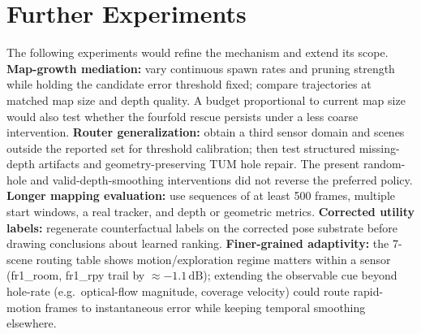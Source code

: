 \documentclass[10pt,twocolumn,letterpaper]{article}
\begin{document}
\section{Further Experiments}
The following experiments would refine the mechanism and extend its scope.
\textbf{Map-growth mediation:} vary continuous spawn rates and pruning strength while holding the candidate error threshold fixed; compare trajectories at matched map size and depth quality. A budget proportional to current map size would also test whether the fourfold rescue persists under a less coarse intervention.
\textbf{Router generalization:} obtain a third sensor domain and scenes outside the reported set for threshold calibration; then test structured missing-depth artifacts and geometry-preserving TUM hole repair. The present random-hole and valid-depth-smoothing interventions did not reverse the preferred policy.
\textbf{Longer mapping evaluation:} use sequences of at least 500 frames, multiple start windows, a real tracker, and depth or geometric metrics.
\textbf{Corrected utility labels:} regenerate counterfactual labels on the corrected pose substrate before drawing conclusions about learned ranking.
\textbf{Finer-grained adaptivity:} the 7-scene routing table shows motion/exploration regime matters within a sensor (fr1\_room, fr1\_rpy trail by $\approx -1.1\,\mathrm{dB}$); extending the observable cue beyond hole-rate (e.g.\ optical-flow magnitude, coverage velocity) could route rapid-motion frames to instantaneous error while keeping temporal smoothing elsewhere.
\end{document}
